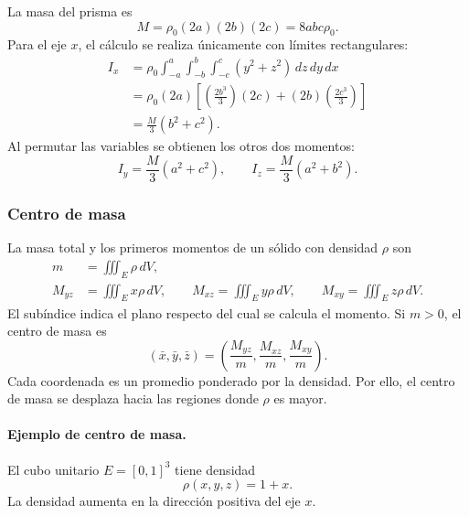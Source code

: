La masa del prisma es
\[
M=\rho_0(2a)(2b)(2c)=8abc\rho_0.
\]
Para el eje $x$, el cálculo se realiza únicamente con límites rectangulares:
\begin{align*}
I_x
&=\rho_0\int_{-a}^{a}\int_{-b}^{b}\int_{-c}^{c}
(y^2+z^2)\,dz\,dy\,dx\\
&=\rho_0(2a)\left[
\left(\frac{2b^3}{3}\right)(2c)
+(2b)\left(\frac{2c^3}{3}\right)\right]\\
&=\frac{M}{3}(b^2+c^2).
\end{align*}
Al permutar las variables se obtienen los otros dos momentos:
\[
I_y=\frac{M}{3}(a^2+c^2),
\qquad
I_z=\frac{M}{3}(a^2+b^2).
\]

\subsubsection{Centro de masa}

La masa total y los primeros momentos de un sólido con densidad $\rho$ son
\begin{align*}
m&=\iiint_E\rho\,dV,\\
M_{yz}&=\iiint_E x\rho\,dV,\qquad
M_{xz}=\iiint_E y\rho\,dV,\qquad
M_{xy}=\iiint_E z\rho\,dV.
\end{align*}
El subíndice indica el plano respecto del cual se calcula el momento. Si $m>0$, el centro de masa es
\[
(\bar x,\bar y,\bar z)
=\left(\frac{M_{yz}}m,\frac{M_{xz}}m,\frac{M_{xy}}m\right).
\]
Cada coordenada es un promedio ponderado por la densidad. Por ello, el centro de masa se desplaza hacia las regiones donde $\rho$ es mayor.

\paragraph{Ejemplo de centro de masa.} El cubo unitario $E=[0,1]^3$ tiene densidad
\[
\rho(x,y,z)=1+x.
\]
La densidad aumenta en la dirección positiva del eje $x$.

